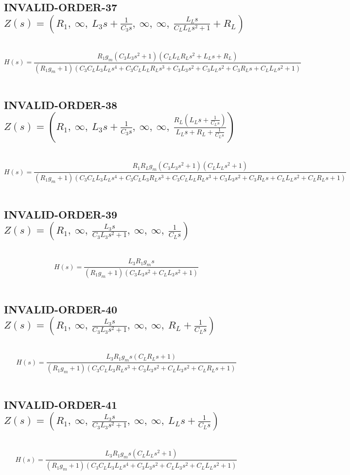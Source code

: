 \documentclass{article}
\begin{document}
\subsection{INVALID-ORDER-37 $Z(s) = \left( R_{1}, \  \infty, \  L_{3} s + \frac{1}{C_{3} s}, \  \infty, \  \infty, \  \frac{L_{L} s}{C_{L} L_{L} s^{2} + 1} + R_{L}\right)$ } \ 
\textbf{\[H(s) = \frac{R_{1} g_{m} \left(C_{3} L_{3} s^{2} + 1\right) \left(C_{L} L_{L} R_{L} s^{2} + L_{L} s + R_{L}\right)}{\left(R_{1} g_{m} + 1\right) \left(C_{3} C_{L} L_{3} L_{L} s^{4} + C_{3} C_{L} L_{L} R_{L} s^{3} + C_{3} L_{3} s^{2} + C_{3} L_{L} s^{2} + C_{3} R_{L} s + C_{L} L_{L} s^{2} + 1\right)}\] } \ 
\subsection{INVALID-ORDER-38 $Z(s) = \left( R_{1}, \  \infty, \  L_{3} s + \frac{1}{C_{3} s}, \  \infty, \  \infty, \  \frac{R_{L} \left(L_{L} s + \frac{1}{C_{L} s}\right)}{L_{L} s + R_{L} + \frac{1}{C_{L} s}}\right)$ } \ 
\textbf{\[H(s) = \frac{R_{1} R_{L} g_{m} \left(C_{3} L_{3} s^{2} + 1\right) \left(C_{L} L_{L} s^{2} + 1\right)}{\left(R_{1} g_{m} + 1\right) \left(C_{3} C_{L} L_{3} L_{L} s^{4} + C_{3} C_{L} L_{3} R_{L} s^{3} + C_{3} C_{L} L_{L} R_{L} s^{3} + C_{3} L_{3} s^{2} + C_{3} R_{L} s + C_{L} L_{L} s^{2} + C_{L} R_{L} s + 1\right)}\] } \ 
\subsection{INVALID-ORDER-39 $Z(s) = \left( R_{1}, \  \infty, \  \frac{L_{3} s}{C_{3} L_{3} s^{2} + 1}, \  \infty, \  \infty, \  \frac{1}{C_{L} s}\right)$ } \ 
\textbf{\[H(s) = \frac{L_{3} R_{1} g_{m} s}{\left(R_{1} g_{m} + 1\right) \left(C_{3} L_{3} s^{2} + C_{L} L_{3} s^{2} + 1\right)}\] } \ 
\subsection{INVALID-ORDER-40 $Z(s) = \left( R_{1}, \  \infty, \  \frac{L_{3} s}{C_{3} L_{3} s^{2} + 1}, \  \infty, \  \infty, \  R_{L} + \frac{1}{C_{L} s}\right)$ } \ 
\textbf{\[H(s) = \frac{L_{3} R_{1} g_{m} s \left(C_{L} R_{L} s + 1\right)}{\left(R_{1} g_{m} + 1\right) \left(C_{3} C_{L} L_{3} R_{L} s^{3} + C_{3} L_{3} s^{2} + C_{L} L_{3} s^{2} + C_{L} R_{L} s + 1\right)}\] } \ 
\subsection{INVALID-ORDER-41 $Z(s) = \left( R_{1}, \  \infty, \  \frac{L_{3} s}{C_{3} L_{3} s^{2} + 1}, \  \infty, \  \infty, \  L_{L} s + \frac{1}{C_{L} s}\right)$ } \ 
\textbf{\[H(s) = \frac{L_{3} R_{1} g_{m} s \left(C_{L} L_{L} s^{2} + 1\right)}{\left(R_{1} g_{m} + 1\right) \left(C_{3} C_{L} L_{3} L_{L} s^{4} + C_{3} L_{3} s^{2} + C_{L} L_{3} s^{2} + C_{L} L_{L} s^{2} + 1\right)}\] } \ 
\end{document}

